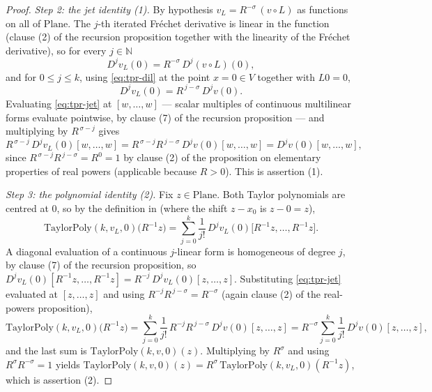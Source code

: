 \begin{proof}
\medskip\noindent\emph{Step 2: the jet identity (1).}
By hypothesis $v_L=R^{-\sigma}\,(v\circ L)$ as functions on all of $\mathrm{Plane}$.  The
$j$-th iterated Fr\'echet derivative is linear in the function (clause (2) of the recursion
proposition together with the linearity of the Fr\'echet derivative), so for every
$j\in\mathbb{N}$
\[
  D^{j}v_L(0)=R^{-\sigma}\,D^{j}(v\circ L)(0),
\]
and for $0\le j\le k$, using \eqref{eq:tpr-dil} at the point $x=0\in V$ together with $L0=0$,
\begin{equation}\label{eq:tpr-jet}
  D^{j}v_L(0)=R^{\,j-\sigma}\,D^{j}v(0).
\end{equation}
Evaluating \eqref{eq:tpr-jet} at $[w,\ldots,w]$ --- scalar multiples of continuous multilinear
forms evaluate pointwise, by clause (7) of the recursion proposition --- and multiplying by
$R^{\,\sigma-j}$ gives
\[
  R^{\,\sigma-j}\,D^{j}v_L(0)[w,\ldots,w]
  =R^{\,\sigma-j}R^{\,j-\sigma}\,D^{j}v(0)[w,\ldots,w]
  =D^{j}v(0)[w,\ldots,w],
\]
since $R^{\,\sigma-j}R^{\,j-\sigma}=R^{0}=1$ by clause (2) of the proposition on elementary
properties of real powers (applicable because $R>0$).  This is assertion (1).

\medskip\noindent\emph{Step 3: the polynomial identity (2).}
Fix $z\in\mathrm{Plane}$.  Both Taylor polynomials are centred at $0$, so by the definition in
 (where the shift $z-x_0$ is $z-0=z$),
\[
  \mathrm{TaylorPoly}(k,v_L,0)\bigl(R^{-1}z\bigr)
  =\sum_{j=0}^{k}\frac{1}{j!}\,D^{j}v_L(0)\bigl[R^{-1}z,\ldots,R^{-1}z\bigr].
\]
A diagonal evaluation of a continuous $j$-linear form is homogeneous of degree $j$, by clause
(7) of the recursion proposition, so
$D^{j}v_L(0)[R^{-1}z,\ldots,R^{-1}z]=R^{-j}\,D^{j}v_L(0)[z,\ldots,z]$.  Substituting
\eqref{eq:tpr-jet} evaluated at $[z,\ldots,z]$ and using $R^{-j}R^{\,j-\sigma}=R^{-\sigma}$
(again clause (2) of the real-powers proposition),
\[
  \mathrm{TaylorPoly}(k,v_L,0)\bigl(R^{-1}z\bigr)
  =\sum_{j=0}^{k}\frac{1}{j!}\,R^{-j}R^{\,j-\sigma}\,D^{j}v(0)[z,\ldots,z]
  =R^{-\sigma}\sum_{j=0}^{k}\frac{1}{j!}\,D^{j}v(0)[z,\ldots,z],
\]
and the last sum is $\mathrm{TaylorPoly}(k,v,0)(z)$.  Multiplying by $R^{\sigma}$ and using
$R^{\sigma}R^{-\sigma}=1$ yields
$\mathrm{TaylorPoly}(k,v,0)(z)=R^{\sigma}\,\mathrm{TaylorPoly}(k,v_L,0)(R^{-1}z)$, which is
assertion (2).
\end{proof}
